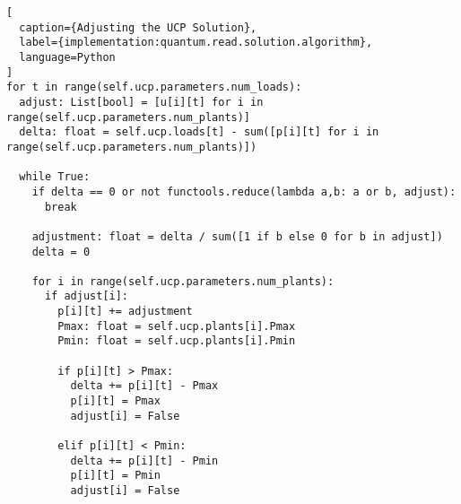 \begin{lstlisting}[
  caption={Adjusting the UCP Solution},
  label={implementation:quantum.read.solution.algorithm},
  language=Python
]
for t in range(self.ucp.parameters.num_loads):
  adjust: List[bool] = [u[i][t] for i in range(self.ucp.parameters.num_plants)]
  delta: float = self.ucp.loads[t] - sum([p[i][t] for i in range(self.ucp.parameters.num_plants)])

  while True:
    if delta == 0 or not functools.reduce(lambda a,b: a or b, adjust):
      break

    adjustment: float = delta / sum([1 if b else 0 for b in adjust])
    delta = 0

    for i in range(self.ucp.parameters.num_plants):
      if adjust[i]:
        p[i][t] += adjustment
        Pmax: float = self.ucp.plants[i].Pmax
        Pmin: float = self.ucp.plants[i].Pmin

        if p[i][t] > Pmax:
          delta += p[i][t] - Pmax
          p[i][t] = Pmax
          adjust[i] = False

        elif p[i][t] < Pmin:
          delta += p[i][t] - Pmin
          p[i][t] = Pmin
          adjust[i] = False
\end{lstlisting}
